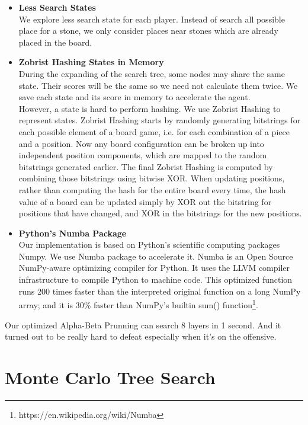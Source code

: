 \documentclass[11pt,a4paper]{article}
\begin{document}
\begin{itemize}
\item \textbf{Less Search States}\\
We explore less search state for each player. Instead of search all possible place for a stone, we only consider places near stones which are already placed in the board. 
\item \textbf{Zobrist Hashing States in Memory}\\
During the expanding of the search tree, some nodes may share the same state. Their scores will be the same so we need not calculate them twice. We save each state and its score in memory to accelerate the agent.\\
However, a state is hard to perform hashing. We use Zobrist Hashing to represent states. Zobrist Hashing starts by randomly generating bitstrings for each possible element of a board game, i.e. for each combination of a piece and a position. Now any board configuration can be broken up into independent position components, which are mapped to the random bitstrings generated earlier. The final Zobrist Hashing is computed by combining those bitstrings using bitwise XOR. When updating positions, rather than computing the hash for the entire board every time, the hash value of a board can be updated simply by XOR out the bitstring for positions that have changed, and XOR in the bitstrings for the new positions.  
\item \textbf{Python's Numba Package}\\
Our implementation is based on Python's scientific computing packages Numpy. We use Numba package to accelerate it. Numba is an Open Source NumPy-aware optimizing compiler for Python. It uses the LLVM compiler infrastructure to compile Python to machine code. This optimized function runs 200 times faster than the interpreted original function on a long NumPy array; and it is 30\% faster than NumPy's builtin sum() function\footnote{https://en.wikipedia.org/wiki/Numba}.

\end{itemize}

Our optimized Alpha-Beta Prunning can search 8 layers in 1 second. And it turned out to be really hard to defeat especially when it's on the offensive.

\section{Monte Carlo Tree Search}
\end{document}
